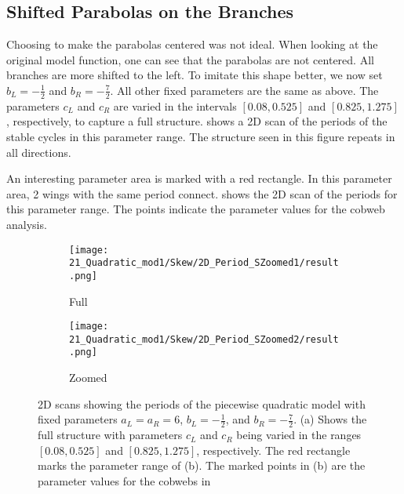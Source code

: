 \subsection{Shifted Parabolas on the Branches}
\label{sec:setup.quad.skewed}

Choosing to make the parabolas centered was not ideal.
When looking at the original model function, one can see that the parabolas are not centered.
All branches are more shifted to the left.
To imitate this shape better, we now set $b_L = -\frac{1}{2}$ and $b_R = -\frac{7}{2}$.
All other fixed parameters are the same as above.
The parameters $c_L$ and $c_R$ are varied in the intervals $[0.08, 0.525]$ and $[0.825, 1.275]$, respectively, to capture a full structure.
 shows a 2D scan of the periods of the stable cycles in this parameter range.
The structure seen in this figure repeats in all directions.

An interesting parameter area is marked with a red rectangle.
In this parameter area, 2 wings with the same period connect.
 shows the 2D scan of the periods for this parameter range.
The points indicate the parameter values for the cobweb analysis.

\begin{figure}
	\centering
	\begin{subfigure}{0.4\textwidth}
		\centering
		\texttt{[image: 21\_Quadratic\_mod1/Skew/2D\_Period\_SZoomed1/result.png]}
		\caption{Full}
		\label{fig:setup.quad.skew.period.full}
	\end{subfigure}
	\begin{subfigure}{0.4\textwidth}
		\texttt{[image: 21\_Quadratic\_mod1/Skew/2D\_Period\_SZoomed2/result.png]}
		\caption{Zoomed}
		\label{fig:setup.quad.skew.period.zoomed}
	\end{subfigure}
	\caption[2D scans showing periods of the skewed piecewise quadratic model]{
		2D scans showing the periods of the piecewise quadratic model with fixed parameters $a_L = a_R = 6$, $b_L = -\frac{1}{2}$, and $b_R = -\frac{7}{2}$.
		(a) Shows the full structure with parameters $c_L$ and $c_R$ being varied in the ranges $[0.08, 0.525]$ and $[0.825, 1.275]$, respectively.
		The red rectangle marks the parameter range of (b).
		The marked points in (b) are the parameter values for the cobwebs in 
	}
	\label{fig:setup.quad.skew.period}
\end{figure}

